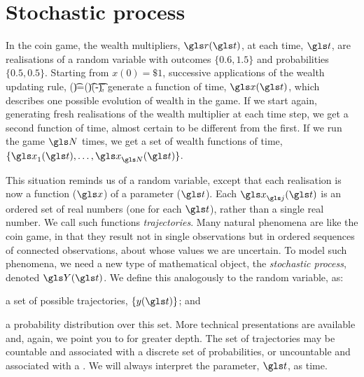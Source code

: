\section{Stochastic process}
In the coin game, the wealth multipliers, $\gr(\t)$, at each time, $\t$, are realisations 
of a random variable with outcomes $\{0.6,1.5\}$ and probabilities $\{0.5,0.5\}$. 
Starting from $x(0)=\$1$, successive applications of the wealth updating rule,
\be
\x(\t)=\gr(\t)\x(\t-\d\t),
\ee
generate a function of time, $\x(\t)$, which describes one possible evolution of wealth in the game. 
If we start again, generating fresh realisations of the wealth multiplier at each time step, we get a 
second function of time, almost certain to be different from the first. If we run the game $\N$ 
times, we get a set of wealth functions of time, $\{\x_1(\t),\dots,\x_{\N}(\t)\}$.

This situation reminds us of a random variable, except that each realisation is now a function 
($\x$) of a parameter ($\t$). Each $\x_\gj(\t)$ is an ordered set of real numbers (one for each 
$\t$), rather than a single real number. We call such functions \textit{trajectories}. Many natural 
phenomena are like the coin game, in that they result not in single observations but in ordered 
sequences of connected observations, about whose values we are uncertain. To model such 
phenomena, we need a new type of mathematical object, the \textit{stochastic process}, 
denoted $\Y(\t)$. We define this analogously to the random variable, as:
\bi
\item a set of possible trajectories, $\{y(\t)\}$; and
\item a probability distribution over this set.
\ei
More technical presentations are available and, again, we point you to \cite[p.~52]{vanKampen1992} 
for greater depth. The set of trajectories may be countable and associated with a discrete 
set of probabilities, or uncountable and associated with a \PDFa. 
We will always interpret 
the parameter, $\t$, as time.

